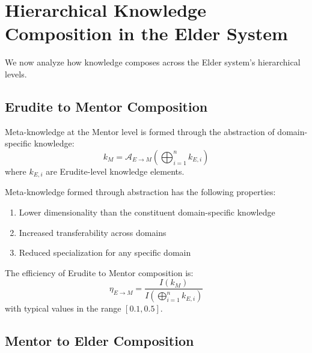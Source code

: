 \section{Hierarchical Knowledge Composition in the Elder System}



We now analyze how knowledge composes across the Elder system's hierarchical levels.

\subsection{Erudite to Mentor Composition}

\begin{definition}
Meta-knowledge at the Mentor level is formed through the abstraction of domain-specific knowledge:
\begin{equation}
k_M = \mathcal{A}_{E \rightarrow M}\left(\bigoplus_{i=1}^{n} k_{E,i}\right)
\end{equation}
where $k_{E,i}$ are Erudite-level knowledge elements.
\end{definition}

\begin{theorem}
Meta-knowledge formed through abstraction has the following properties:
\begin{enumerate}
    \item Lower dimensionality than the constituent domain-specific knowledge
    \item Increased transferability across domains
    \item Reduced specialization for any specific domain
\end{enumerate}
\end{theorem}

\begin{theorem}
The efficiency of Erudite to Mentor composition is:
\begin{equation}
\eta_{E \rightarrow M} = \frac{I(k_M)}{I\left(\bigoplus_{i=1}^{n} k_{E,i}\right)}
\end{equation}
with typical values in the range $[0.1, 0.5]$.
\end{theorem}

\subsection{Mentor to Elder Composition}


